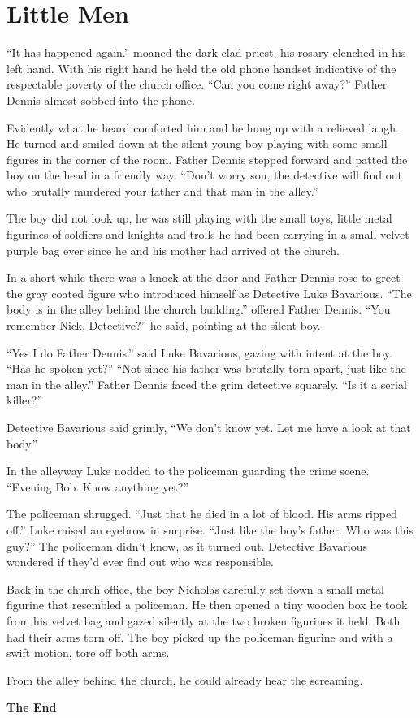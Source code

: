 \chapter{Little Men}


``It has happened again.'' moaned the dark clad priest, his rosary
clenched in his left hand. With his right hand he held the old
phone handset indicative of the respectable poverty of the church
office. ``Can you come right away?'' Father Dennis almost sobbed into
the phone.

Evidently what he heard comforted him and he hung up with a
relieved laugh. He turned and smiled down at the silent young boy
playing with some small figures in the corner of the room. Father
Dennis stepped forward and patted the boy on the head in a friendly
way. ``Don't worry son, the detective will find out who brutally
murdered your father and that man in the alley.''

The boy did not look up, he was still playing with the small toys,
little metal figurines of soldiers and knights and trolls he had
been carrying in a small velvet purple bag ever since he and his
mother had arrived at the church.

In a short while there was a knock at the door and Father Dennis
rose to greet the gray coated figure who introduced himself as
Detective Luke Bavarious. ``The body is in the alley behind the
church building.'' offered Father Dennis. ``You remember Nick,
Detective?'' he said, pointing at the silent boy.

``Yes I do Father Dennis.'' said Luke Bavarious, gazing with intent
at the boy. ``Has he spoken yet?'' ``Not since his father was brutally
torn apart, just like the man in the alley.'' Father Dennis faced
the grim detective squarely. ``Is it a serial killer?''

Detective Bavarious said grimly, ``We don't know yet. Let me have a
look at that body.''

In the alleyway Luke nodded to the policeman guarding the crime
scene. ``Evening Bob. Know anything yet?''

The policeman shrugged. ``Just that he died in a lot of blood. His
arms ripped off.'' Luke raised an eyebrow in surprise. ``Just like
the boy's father. Who was this guy?'' The policeman didn't know, as
it turned out. Detective Bavarious wondered if they'd ever find out
who was responsible.

Back in the church office, the boy Nicholas carefully set down a
small metal figurine that resembled a policeman. He then opened a
tiny wooden box he took from his velvet bag and gazed silently at
the two broken figurines it held. Both had their arms torn off. The
boy picked up the policeman figurine and with a swift motion, tore
off both arms.

From the alley behind the church, he could already hear the
screaming.



{\bf The End} 
 





